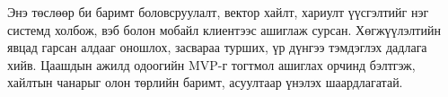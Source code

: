 \documentclass[../main.tex]{subfiles}
\begin{document}
Энэ төслөөр би баримт боловсруулалт, вектор хайлт, хариулт үүсгэлтийг
нэг системд холбож, вэб болон мобайл клиентээс ашиглаж сурсан. Хөгжүүлэлтийн
явцад гарсан алдааг оношлох, засвараа турших, үр дүнгээ тэмдэглэх дадлага
хийв. Цаашдын ажилд одоогийн MVP-г тогтмол ашиглах орчинд бэлтгэж,
хайлтын чанарыг олон төрлийн баримт, асуултаар үнэлэх шаардлагатай.
\end{document}
